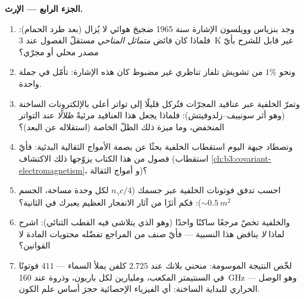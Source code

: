 \begin{problem}
\medskip\noindent\textbf{الجزء الرابع --- الإرث.}
\begin{enumerate}[resume]
  \item وجد بنزياس وويلسون الإشارة سنة 1965 ضجيجَ هوائي
        لا يُزال (بعد طرد الحمام): فلماذا
        كان فائض \emph{متماثل المناحي} مستقلّ الفصول عند
        \qty{3}{K} غير قابل للشرح بأيّ مصدر محلي أو مجرّي؟
  \item ونحو $1\%$ من تشويش تلفاز تناظري غير مضبوط
        كان هذه الإشارة: تأمّل في جملة واحدة.
  \item وتمرّ الخلفية عبر عناقيد المجرّات فتُركل قليلًا
        إلى تواتر أعلى بالإلكترونات الساخنة (وهو أثر
        سونييف--زلدوفيتش): فلماذا يجعل هذا العناقيد
        مرئيةً \emph{ظلالًا} عند التواتر المنخفض، وما ميزة
        ذلك الظلّ الخاصة (استقلاله عن
        البعد)؟
  \item وتصطاد جبهة اليوم استقطاب الخلفية بحثًا عن
        بصمة الأمواج الثقالية البدئية: فأيّ فصول
        من هذا الكتاب يزوّجها ذلك الاكتشاف
        (استقطاب \cref{ch:b3:covariant-electromagnetism}، و
        أمواج الثقالة)؟
  \item احسب تدفق فوتونات الخلفية عبر جسمك
        ($n_\gamma c/4$ لكل وحدة مساحة،  الجسم
        $\sim\qty{0.5}{m^2}$): فكم أثرًا من آثار الانفجار العظيم
        يعبرك في الثانية؟
  \item والخلفية تخصّ مرجعًا ساكنًا واحدًا (وهو الذي يتلاشى فيه
        القطب الثنائي): اشرح لماذا \emph{لا} يناقض هذا
        النسبية --- فأيّ صنف من المراجع تفضّله
        محتويات المادة لا القوانين؟
  \item لخّص النتيجة الموسومة: منحني بلانك عند $2.725$ كلفن
        يملأ السماء --- $411$ فوتونًا في السنتيمتر
        المكعب، ومليارين لكل باريون، وذروة عند
        \qty{160}{GHz} --- وهو الوصل الحراري للبداية
        الساخنة: أي الفيزياء الإحصائية حجرَ أساس
        علم الكون.
\end{enumerate}
\end{problem}
